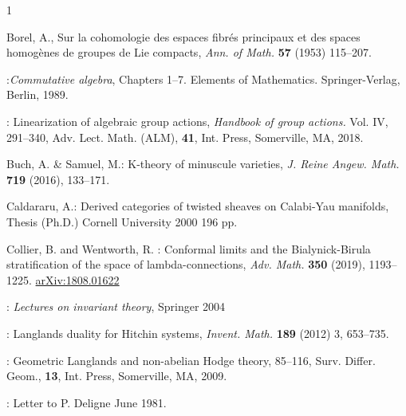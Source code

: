 \documentclass[12pt]{article}
\numberwithin{equation}{section}
\theoremstyle{remark}
\theoremstyle{definition}
\numberwithin{theorem}{section}
\renewcommand{\1}{\mathbbm{1}}
\begin{document}
\begin{thebibliography}{1}
	
{\sc Borel, A.}, { Sur la cohomologie des espaces fibr\'es principaux et des spaces homog\`enes de groupes de Lie compacts}, {\em Ann. of Math.} {\bf 57} (1953) 115--207.	
	
:{\em Commutative algebra}, Chapters 1--7. Elements of Mathematics. Springer-Verlag, Berlin, 1989.

: Linearization of algebraic group actions,  {\em Handbook of group actions.} Vol. IV, 291--340,
Adv. Lect. Math. (ALM), {\bf 41}, Int. Press, Somerville, MA, 2018.

{\sc Buch, A. \& Samuel, M.}: { K-theory of minuscule varieties}, { \em J. Reine Angew. Math.} {\bf 719} (2016), 133--171.

 {\sc Caldararu, A.}:
Derived categories of twisted sheaves on Calabi-Yau manifolds, 
Thesis (Ph.D.)  Cornell University 2000 196 pp.

 {\sc  Collier, B. {\rm and}  Wentworth, R.} : Conformal limits and the Bialynick-Birula stratification of the space of lambda-connections, {\em Adv. Math.} {\bf 350} (2019), 1193--1225.
\href{https://arxiv.org/abs/arXiv:1808.01622}{arXiv:1808.01622}

	
	: {\em Lectures on invariant theory}, Springer 2004
	
	: Langlands duality for Hitchin systems, {\em Invent. Math.} {\bf 189} (2012) 3, 653--735. %
	
		:
	Geometric Langlands and non-abelian Hodge theory, 85--116,
	Surv. Differ. Geom., {\bf 13}, Int. Press, Somerville, MA, 2009.
	
	
	: Letter to P. Deligne June 1981.
	
	

\end{thebibliography}
\end{document}
